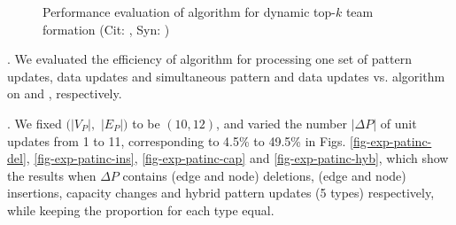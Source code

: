 \begin{figure}[tb!]
\begin{center}
\hspace{0.2ex}
\vspace{-2ex}

\end{center}
\vspace{-3ex}
\caption{Performance evaluation of algorithm \inc for dynamic top-$k$ team formation (Cit: \citationd, Syn: \synthetic)}
\label{exp-inc}
\vspace{-3ex}
\end{figure}

. We evaluated the efficiency of algorithm \inc for processing one set of pattern updates, data updates and simultaneous pattern and data updates vs. algorithm \optgrouprec on \citationd and \synthetic, respectively.


. We fixed $(|V_{P}|,$ $|E_{P}|)$ to be $(10, 12)$, and varied the number $|\Delta P|$ of unit updates from 1 to 11, corresponding to 4.5\% to 49.5\% in
Figs. \ref{fig-exp-patinc-del}, \ref{fig-exp-patinc-ins}, \ref{fig-exp-patinc-cap} and \ref{fig-exp-patinc-hyb},
which show the results when $\Delta P$ contains (edge and node) deletions, (edge and node) insertions, capacity changes and hybrid pattern updates (5 types) respectively,
while keeping the proportion for each type equal.

